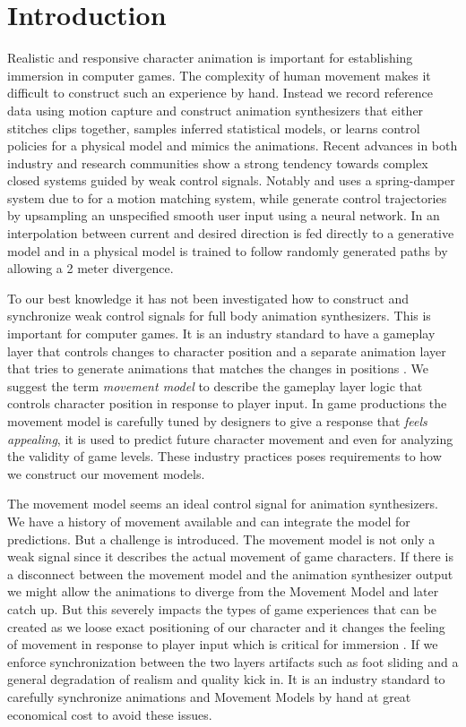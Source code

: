 \section{Introduction}
Realistic and responsive character animation is important for establishing immersion in computer games. The complexity of human movement makes it difficult to construct such an experience by hand. Instead we record reference data using motion capture and construct animation synthesizers that either stitches clips together, samples inferred statistical models, or learns control policies for a physical model and mimics the animations. Recent advances in both industry and research communities show a strong tendency towards complex closed systems guided by weak control signals. Notably \citep{holden.ea20} and \citep{Bergamin19} uses a spring-damper system due to \citep{kermse.04} for a motion matching system, while \citep{startke20} generate control trajectories by upsampling an unspecified smooth user input using a neural network. In \citep{zhang18} an interpolation between current and desired direction is fed directly to a generative model and in \citep{peng17} a physical model is trained to follow randomly generated paths by allowing a 2 meter divergence. 


To our best knowledge it has not been investigated how to construct and synchronize weak control signals for full body  animation synthesizers. This is important for computer games. It is an industry standard to have a gameplay layer that controls changes to character position and a separate animation layer that tries to generate animations that matches the changes in positions \citep{holden18}. We suggest the term \textit{movement model} to describe the gameplay layer logic that controls character position in response to player input. In game productions the movement model is carefully tuned by designers to give a response that \textit{feels appealing}, it is used to predict future character movement and even for analyzing the validity of game levels. These industry practices poses requirements to how we construct our movement models. 

The movement model seems an ideal control signal for animation synthesizers. We have a history of movement available and can integrate the model for predictions. But a challenge is introduced. The movement model is not only a weak signal since it describes the actual movement of game characters. If there is a disconnect between the movement model and the animation synthesizer output we might allow the animations to diverge from the Movement Model and later catch up. But this severely impacts the types of game experiences that can be created as we loose exact positioning of our character and it changes the feeling of movement in response to player input which is critical for immersion . If we enforce synchronization between the two layers artifacts such as foot sliding and a general degradation of realism and quality kick in. It is an industry standard to carefully synchronize animations and Movement Models by hand at great economical cost to avoid these issues.

